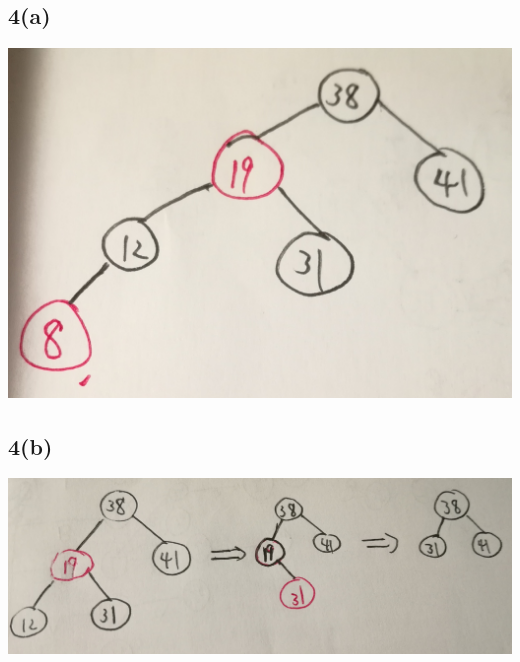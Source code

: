 \documentclass[UTF8]{ctexart}
\begin{document}
	\subsection*{4(a)}
	\includegraphics[scale=0.1]{1.jpg}
	\subsection*{4(b)}
	\includegraphics[scale=0.1]{2.jpg}
\end{document}
